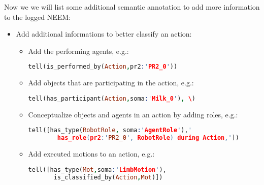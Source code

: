 Now we we will list some additional semantic annotation to add more information to the logged NEEM:

\begin{itemize}
	\item Add additional informations to better classify an action: 
	\begin{itemize}
		\item Add the performing agents, e.g.:
			\begin{lstlisting}[language=Prolog]
tell(is_performed_by(Action,pr2:'PR2_0'))
			\end{lstlisting}
		\item Add objects that are participating in the action, e.g.:
			\begin{lstlisting}[language=Prolog]
tell(has_participant(Action,soma:'Milk_0'), \)
			\end{lstlisting}
		\item Conceptualize objects and agents in an action by adding roles, e.g.:
			\begin{lstlisting}[language=Prolog]
tell([has_type(RobotRole, soma:'AgentRole'),' 
		has_role(pr2:'PR2_0', RobotRole) during Action,'])
			\end{lstlisting}
		\item Add executed motions to an action, e.g.:
			\begin{lstlisting}[language=Prolog]
tell([has_type(Mot,soma:'LimbMotion'),
       is_classified_by(Action,Mot)])
			\end{lstlisting}
	\end{itemize}
\end{itemize}

%
%
%
